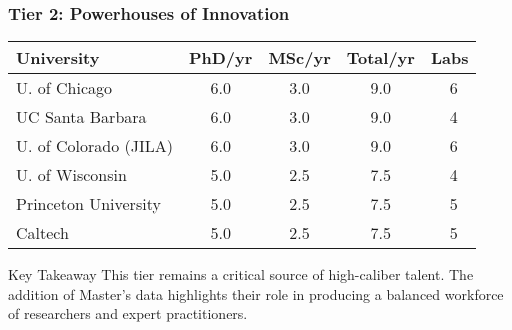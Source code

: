 \documentclass[aspectratio=169]{beamer}
\newcommand{\tabletext}{\normalsize}
\begin{document}
\begin{frame}
    \frametitle{Tier 2: Powerhouses of Innovation}
    \subtitle{Large producers with 7-9 total theses per year}

    \begin{table}
        \centering
        \tabletext
        \begin{tabularx}{\textwidth}{
            l
            S[table-format=1.1]
            S[table-format=1.1]
            S[table-format=1.1]
            S[table-format=2.0, table-space-text-pre=~]
        }
            \toprule
            \textbf{University} & {\textbf{PhD/yr}} & {\textbf{MSc/yr}} & {\textbf{Total/yr}} & {\textbf{Labs}} \\
            \midrule
            U. of Chicago & 6.0 & 3.0 & 9.0 & ~6 \\
            UC Santa Barbara & 6.0 & 3.0 & 9.0 & ~4 \\
            U. of Colorado (JILA) & 6.0 & 3.0 & 9.0 & ~6 \\
            U. of Wisconsin & 5.0 & 2.5 & 7.5 & ~4 \\
            Princeton University & 5.0 & 2.5 & 7.5 & ~5 \\
            Caltech & 5.0 & 2.5 & 7.5 & ~5 \\
            \bottomrule
        \end{tabularx}
    \end{table}
    
    \begin{block}{Key Takeaway}
    This tier remains a critical source of high-caliber talent. The addition of Master's data highlights their role in producing a balanced workforce of researchers and expert practitioners.
    \end{block}
\end{frame}
\end{document}
